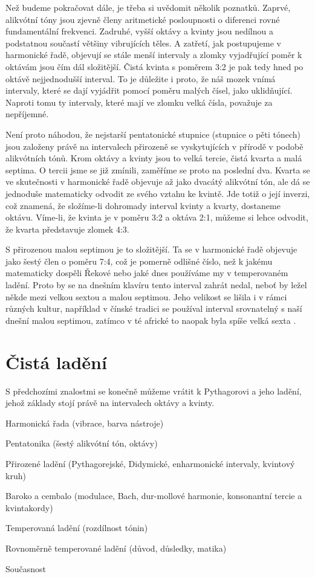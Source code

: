 \documentclass[12pt]{article}
\begin{document}
Než budeme pokračovat dále, je třeba si uvědomit několik poznatků. Zaprvé, alikvótní tóny jsou zjevně členy aritmetické posloupnosti o diferenci rovné fundamentální frekvenci. Zadruhé, vyšší oktávy a kvinty jsou nedílnou a podstatnou součastí většiny vibrujících těles. A zatřetí, jak postupujeme v harmonické řadě, objevují se stále menší intervaly a zlomky vyjadřující poměr k oktávám jsou čím dál složitější. Čistá kvinta s poměrem 3:2 je pak tedy hned po oktávě nejjednodušší interval. To je důležite i proto, že náš mozek vnímá intervaly, které se dají vyjádřit pomocí poměru malých čísel, jako uklidňující. Naproti tomu ty intervaly, které mají ve zlomku velká čísla, považuje za nepříjemné.

Není proto náhodou, že nejstarší pentatonické stupnice (stupnice o pěti tónech) jsou založeny právě na intervalech přirozeně se vyskytujících v přírodě v podobě alikvótních tónů. Krom oktávy a kvinty jsou to velká tercie, čistá kvarta a malá septima. O tercii jsme se již zmínili, zaměříme se proto na poslední dva. Kvarta se ve skutečnosti v harmonické řadě objevuje až jako dvacátý alikvótní tón, ale dá se jednoduše matematicky odvodit ze svého vztahu ke kvintě. Jde totiž o její inverzi, což znamená, že složíme-li dohromady interval kvinty a kvarty, dostaneme oktávu. Víme-li, že kvinta je v poměru 3:2 a oktáva 2:1, můžeme si lehce odvodit, že kvarta představuje zlomek 4:3.

S přirozenou malou septimou je to složitější. Ta se v harmonické řadě objevuje jako šestý člen o poměru 7:4, což je pomerně odlišné číslo, než k jakému matematicky dospěli Řekové nebo jaké dnes používáme my v temperovaném ladění. Proto by se na dnešním klavíru tento interval zahrát nedal, neboť by ležel někde mezi velkou sextou a malou septimou. Jeho velikost se lišila i v rámci různých kultur, například v čínské tradici se používal interval srovnatelný s naší dnešní malou septimou, zatímco v té africké to naopak byla spíše velká sexta \cite{bernstein}.

\section{Čistá ladění}

S předchozími znalostmi se konečně můžeme vrátit k Pythagorovi a jeho ladění, jehož základy stojí právě na intervalech oktávy a kvinty.  

\pagebreak

Harmonická řada (vibrace, barva nástroje)

Pentatonika (šestý alikvótní tón, oktávy)

Přirozené ladění (Pythagorejské, Didymické, enharmonické intervaly, kvintový kruh)

Baroko a cembalo (modulace, Bach, dur-mollové harmonie, konsonantní tercie a kvintakordy)

Temperovaná ladění (rozdílnost tónin)

Rovnoměrně temperované ladění (důvod, důsledky, matika)

Současnost


{}

\end{document}
